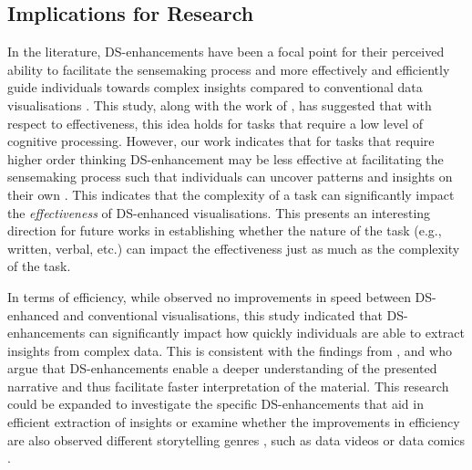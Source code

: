 \subsection{Implications for Research}
In the literature, DS-enhancements have been a focal point for their perceived ability to facilitate the sensemaking process and more effectively and efficiently guide individuals towards complex insights compared to conventional data visualisations \cite{segel2010narrative, boy2015storytelling, Daradkeh2021}. This study, along with the work of \citet{shao2024datastorytelling}, has suggested that with respect to effectiveness, this idea holds for tasks that require a low level of cognitive processing. However, our work indicates that for tasks that require higher order thinking DS-enhancement may be less effective at facilitating the sensemaking process such that individuals can uncover patterns and insights on their own \cite{campos2021makingsense}. This indicates that the complexity of a task can significantly impact the \textit{effectiveness} of DS-enhanced visualisations. This presents an interesting direction for future works in establishing whether the nature of the task (e.g., written, verbal, etc.) can impact the effectiveness just as much as the complexity of the task.

In terms of efficiency, while \citet{shao2024datastorytelling} observed no improvements in speed between DS-enhanced and conventional visualisations, this study indicated that DS-enhancements can significantly impact how quickly individuals are able to extract insights from complex data. This is consistent with the findings from \citet{echeverria2018exploratory, de2014evaluating}, and \citet{Pozdniakov2023how} who argue that DS-enhancements enable a deeper understanding of the presented narrative and thus facilitate faster interpretation of the material. This research could be expanded to investigate the specific DS-enhancements that aid in efficient extraction of insights or examine whether the improvements in efficiency are also observed different storytelling genres \cite{segel2010narrative}, such as data videos \cite{amini2015datavideos, xian2023datavideos} or data comics \cite{bach2017emerging, milesi2024comics}.


